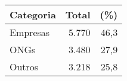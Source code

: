\begin{tabular}{lrr}
\toprule
Categoria & Total & (\%) \\
\midrule
Empresas & 5{.}770 & 46{,}3 \\
ONGs & 3{.}480 & 27{,}9 \\
Outros & 3{.}218 & 25{,}8 \\
\bottomrule
\end{tabular}
